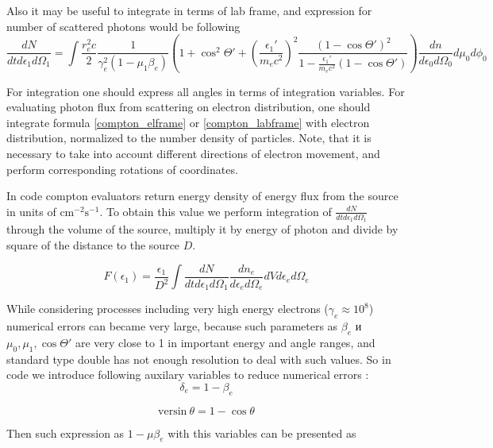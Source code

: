 Also it may be useful to integrate in terms of lab frame, and expression for number of scattered photons would be following
\begin{equation}\label{compton_labframe}
	\frac{dN}{dt d\epsilon_1 d\Omega_1}=\int \frac{r_e^2 c}{2} \frac{1}{\gamma_e^2(1-\mu_1\beta_e)} \left(1 + \cos^2\Theta'+\left(\frac{\epsilon_1'}{m_e c^2}\right)^2\frac{(1-\cos\Theta')^2}{1-\frac{\epsilon_1'}{m_e c^2}(1 - \cos \Theta')}\right)\frac{dn}{d\epsilon_0 d\Omega_0}d\mu_0 d\phi_0
\end{equation}

For integration one should express all angles in terms of integration variables. For evaluating photon flux from scattering on electron distribution, one should integrate formula \ref{compton_elframe} or \ref{compton_labframe} with electron distribution, normalized to the number density of particles. Note, that it is necessary to take into account different directions of electron movement, and perform corresponding rotations of coordinates.

In code compton evaluators return energy density of energy flux from the source in units of $\text{cm}^{-2} \text{s}^{-1}$. To obtain this value we perform integration of $\frac{dN}{dt d\epsilon_1 d\Omega_1}$ through the volume of the source, multiply it by energy of photon and divide by square of the distance to the source $D$.

\begin{equation}\label{comtonKlein}
	F(\epsilon_1)=\frac{\epsilon_1}{D^2}\int \frac{dN}{dt d\epsilon_1 d\Omega_1} \frac{dn_e}{d\epsilon_e d\Omega_e} dV d\epsilon_e d\Omega_e
\end{equation}

While considering processes including very high energy electrons ($\gamma_e \approx 10^8$) numerical errors can became very large, because such parameters as $\beta_e$ и $\mu_0, \mu_1, \cos \Theta'$ are very close to 1 in important energy and angle ranges, and standard type double has not enough resolution to deal with such values. So in code we introduce following auxilary variables to reduce numerical errors
:
\begin{equation}
	\delta_e = 1 - \beta_e
\end{equation}

\begin{equation}
	\text{versin}~\theta = 1 - \cos \theta
\end{equation}

Then such expression as $1 - \mu \beta_e$ with this variables can be presented as

